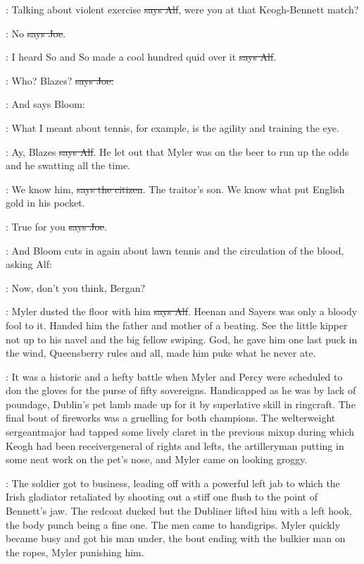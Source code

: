 \bergan:
Talking about violent exercise \sout{says Alf},
were you at that Keogh-Bennett match?

\joe:
No \sout{says Joe}.

\bergan:
I heard So and So made a cool hundred quid
over it \sout{says Alf}.

\joe:
Who? Blazes? \sout{says Joe.}

\Nq:
And says Bloom:

\Bloom:
What I meant about tennis, for example,
is the agility and training the eye.

\bergan:
Ay, Blazes \sout{says Alf}.
He let out that Myler was on the beer to run up
the odds and he swatting all the time.

\citizen:
We know him, \sout{says the citizen}.
The traitor's son. We know what put
English gold in his pocket.

\joe:
True for you \sout{says Joe}.

\Nq:
And Bloom cuts in again about lawn tennis and the circulation of the
blood, asking Alf:

\Bloom:
Now, don't you think, Bergan?

\bergan:
Myler dusted the floor with him \sout{says Alf}.
Heenan and Sayers was only a
bloody fool to it. Handed him the father and mother of a beating. See the
little kipper not up to his navel and the big fellow swiping. God, he gave
him one last puck in the wind, Queensberry rules and all, made him puke
what he never ate.

:
It was a historic and a hefty battle
when Myler and Percy were
scheduled to don the gloves for the purse of fifty sovereigns. Handicapped
as he was by lack of poundage, Dublin's pet lamb made up for it by
superlative skill in ringcraft. The final bout of fireworks was a
gruelling for both champions. The welterweight sergeantmajor had
tapped some lively claret in the previous mixup during which Keogh
had been receivergeneral of rights and lefts, the artilleryman
putting in some neat work on the pet's nose, and Myler came on
looking groggy.

:
The soldier got to business, leading off with a
powerful left jab to which the Irish gladiator retaliated by shooting
out a stiff one flush to the point of Bennett's jaw. The redcoat
ducked but the Dubliner lifted him with a left hook,
the body punch being
a fine one. The men came to handigrips. Myler quickly became busy and got
his man under, the bout ending with the bulkier man on the ropes, Myler
punishing him.

